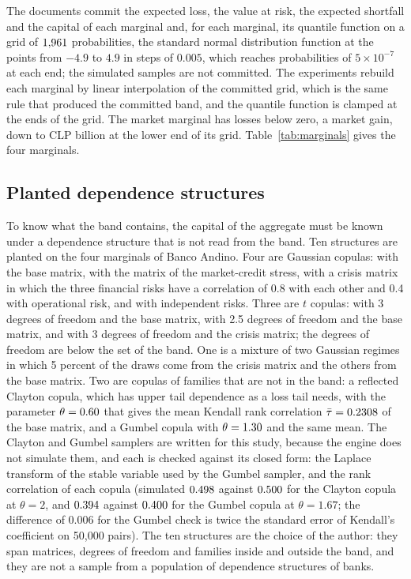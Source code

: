 The documents commit the expected loss, the value at risk, the expected shortfall and the capital of each marginal and, for each
marginal, its quantile function on a grid of $1{,}961$ probabilities, the standard normal distribution function at the points from
$-4.9$ to $4.9$ in steps of $0.005$, which reaches probabilities of $5\times10^{-7}$ at each end; the simulated samples are not
committed. The experiments rebuild each marginal by linear interpolation of the committed grid, which is the same rule that
produced the committed band, and the quantile function is clamped at the ends of the grid. The market marginal has losses below
zero, a market gain, down to CLP \bdMarketGridMin{} billion at the lower end of its grid. Table~\ref{tab:marginals} gives the
four marginals.

\subsection{Planted dependence structures}
\label{sec:design-planted}

To know what the band contains, the capital of the aggregate must be known under a dependence structure that is not read from the
band. Ten structures are planted on the four marginals of Banco Andino. Four are Gaussian copulas: with the base matrix, with
the matrix of the market-credit stress, with a crisis matrix in which the three financial risks have a correlation of 0.8 with
each other and 0.4 with operational risk, and with independent risks. Three are $t$ copulas: with 3 degrees of freedom and the
base matrix, with 2.5 degrees of freedom and the base matrix, and with 3 degrees of freedom and the crisis matrix; the degrees
of freedom are below the set of the band. One is a mixture of two Gaussian regimes in which 5 percent of the draws come from the
crisis matrix and the others from the base matrix. Two are copulas of families that are not in the band: a reflected Clayton copula,
which has upper tail dependence as a loss tail needs, with the parameter $\theta=0.60$ that gives the mean Kendall rank
correlation $\bar\tau=0.2308$ of the base matrix, and a Gumbel copula with $\theta=1.30$ and the same mean. The Clayton and Gumbel
samplers are written for this study, because the engine does not simulate them, and each is checked against its closed
form: the Laplace transform of the stable variable used by the Gumbel sampler, and the rank correlation of each copula
(simulated $0.498$ against $0.500$ for the Clayton copula at $\theta=2$, and $0.394$ against
$0.400$ for the Gumbel copula at $\theta=1.67$; the difference of 0.006 for the Gumbel check is twice the standard
error of Kendall's coefficient on 50,000 pairs). The ten structures are the choice of the author: they span matrices, degrees of
freedom and families inside and outside the band, and they are not a sample from a population of dependence structures of banks.

